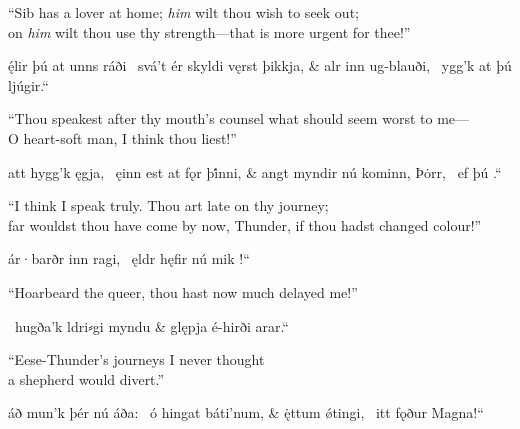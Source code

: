 \bvb{}%
“Sib has a lover at home; \emph{him} wilt thou wish to seek out; \\
on \emph{him} wilt thou use thy strength---that is more urgent for thee!”\evb\evg


\bvg\bva{}%
%
ę́lir þú at unns ráði \hld\ svá’t ér skyldi vęrst þikkja, &
alr inn ug-blauði, \hld\ ygg’k at þú ljúgir.“\eva

\bvb{}%
“Thou speakest after thy mouth’s counsel what should seem worst to me--- \\
O heart-soft man, I think thou liest!”\evb\evg


\bvg\bva{}%
%
att hygg’k  ęgja, \hld\ ęinn est at fǫr þi̇́nni, &
angt myndir nú kominn, Þȯrr, \hld\ ef þú .“\eva

\bvb{}%
“I think I speak truly.  Thou art late on thy journey; \\
far wouldst thou have come by now, Thunder, if thou hadst changed colour!”\evb\evg


\bvg\bva{}%
%
ár·barðr inn ragi, \hld\ ęldr hęfir nú mik !“\eva

\bvb{}%
“Hoarbeard the queer, thou hast now much delayed me!”\evb\evg


\bvg\bva{}%
%
 \hld\ hugða’k ldri⸗gi myndu &
\ind glępja é-hirði arar.“\eva

\bvb{}%
“Eese-Thunder’s journeys I never thought \\
\ind a shepherd would divert.”\evb\evg


\bvg\bva{}%
%
áð mun’k þér nú áða: \hld\ ó hingat báti’num, &
ę̇ttum ǿtingi, \hld\ itt fǫður Magna!“\eva

